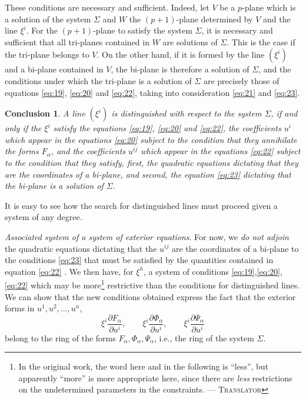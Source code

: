 \documentclass[leqno,11pt]{book}
\numberwithin{equation}{chapter}
\newcommand{\pd}{\partial}
\theoremstyle{shape1}
\newtheorem*{concl*}{\hspace{15pt}Conclusion}
\theoremstyle{shape0}
\theoremstyle{shape2}
\theoremstyle{definition}
\begin{document}
These conditions are necessary and sufficient. Indeed, let $V$ be a $p$-plane which is a solution of the system $\Sigma$ and $W$ the $(p+1)$-plane determined by $V$ and the line $\xi^{i}$. For the $(p+1)$-plane to satisfy the system $\Sigma$, it is necessary and sufficient that all tri-planes contained in $W$ are solutions of $\Sigma$. This is the case if the tri-plane belongs to $V$. On the other hand, if it is formed by the line $(\xi^{i})$ and a bi-plane contained in $V$, the bi-plane is therefore a solution of $\Sigma$, and the conditions under which the tri-plane is a solution of $\Sigma$ are precisely those of equations \eqref{eq:19}, \eqref{eq:20} and \eqref{eq:22}, taking into consideration \eqref{eq:21} and \eqref{eq:23}.

\begin{concl*}
  A line $(\xi^{i})$ is distinguished with respect to the system $\Sigma$, if and only if the $\xi^{i}$ satisfy the equations \eqref{eq:19}, \eqref{eq:20} and \eqref{eq:22}, the coefficients $u^{i}$ which appear in the equations \eqref{eq:20}  subject to the  condition that they annihilate the forms $F_{\alpha}$, and the coefficients $u^{ij}$ which appear in the equations \eqref{eq:22}  subject to the condition that they satisfy, first, the quadratic equations dictating that they are the coordinates of a bi-plane, and second, the equation \eqref{eq:23} dictating that the bi-plane is a solution of $\Sigma$.
\end{concl*}

It is easy to see how the search for distinguished lines must proceed given a system of any degree.

\vspace{12pt}\fsec \emph{Associated system of a system of exterior equations}. For now, we \emph{do not adjoin} the quadratic equations dictating that the $u^{ij}$ are the coordinates of a bi-plane to the conditions \eqref{eq:23} that must be  satisfied by the quantities contained in equation \eqref{eq:22} . We then have, for $\xi^{h}$, a system of conditions \eqref{eq:19},\eqref{eq:20}, \eqref{eq:22} which may be more\footnote{In the original work, the word here and in the following is ``less'', but apparently ``more'' is more appropriate here, since there are \emph{less} restrictions on the undetermined parameters in the constraints. --- \textsc{Translator}} restrictive than the conditions for distinguished lines. We can show that the new conditions obtained express the fact that the exterior forms in $u^{1},u^{2},\dots,u^{n}$,
\[
\xi^{i}\frac{\pd F_{\alpha}}{\pd u^{i}},\qquad
\xi^{i}\frac{\pd \Phi_{\alpha}}{\pd u^{i}},\qquad
\xi^{i}\frac{\pd \Psi_{\alpha}}{\pd u^{i}}
\]
belong to the ring of the forms $F_{\alpha},\Phi_{\alpha},\Psi_{\alpha}$, {i.e.}, the ring of the system $\Sigma$.
\end{document}
